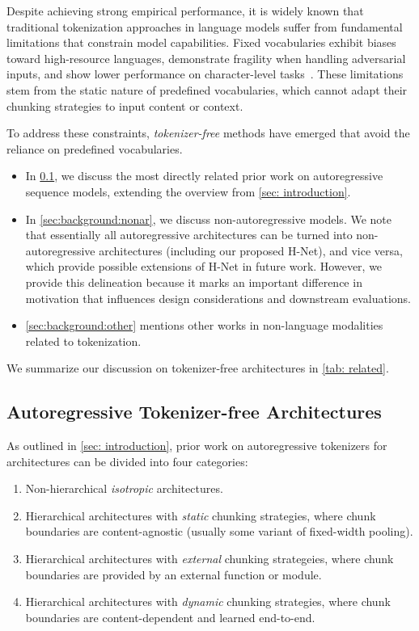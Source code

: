 \documentclass{article}
\newcommand{\citep}{\parencite}
\theoremstyle{plain}
\theoremstyle{remark}
\begin{document}
Despite achieving strong empirical performance, it is widely known that traditional tokenization approaches in language models suffer from fundamental limitations that constrain model capabilities.
Fixed vocabularies exhibit biases toward high-resource languages, demonstrate fragility when handling adversarial inputs, and show lower performance on character-level tasks~\citep{petrov2023language, ahia2023all, belinkov2017synthetic, Adv-BERT, ByT5}.
These limitations stem from the static nature of predefined vocabularies, which cannot adapt their chunking strategies to input content or context.

To address these constraints, \emph{tokenizer-free} methods have emerged that avoid the reliance on predefined vocabularies.

\begin{itemize}
    \item In \cref{sec:background:ar}, we discuss the most directly related prior work on autoregressive sequence models, extending the overview from \cref{sec: introduction}.
    \item In \cref{sec:background:nonar}, we discuss non-autoregressive models. We note that essentially all autoregressive architectures can be turned into non-autoregressive architectures (including our proposed H-Net), and vice versa, which provide possible extensions of H-Net in future work. However, we provide this delineation because it marks an important difference in motivation that influences design considerations and downstream evaluations.
    \item \cref{sec:background:other} mentions other works in non-language modalities related to tokenization.
\end{itemize}

We summarize our discussion on tokenizer-free architectures in \cref{tab: related}.

\subsection{Autoregressive Tokenizer-free Architectures}
\label{sec:background:ar} 

As outlined in \cref{sec: introduction}, prior work on autoregressive tokenizers for architectures can be divided into four categories:
\begin{enumerate}
    \item Non-hierarchical \emph{isotropic} architectures.
    \item Hierarchical architectures with \emph{static} chunking strategies, where chunk boundaries are content-agnostic (usually some variant of fixed-width pooling).
    \item Hierarchical architectures with \emph{external} chunking strategeies, where chunk boundaries are provided by an external function or module.
    \item Hierarchical architectures with \emph{dynamic} chunking strategies, where chunk boundaries are content-dependent and learned end-to-end.
\end{enumerate}
\end{document}
